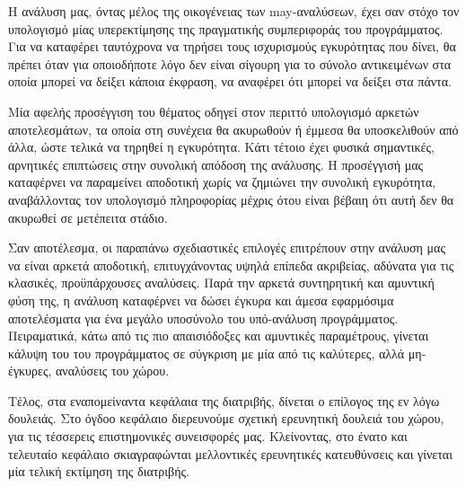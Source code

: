 Η ανάλυση μας, όντας μέλος της οικογένειας των {\en may}-αναλύσεων, έχει σαν στόχο τον υπολογισμό μίας υπερεκτίμησης της πραγματικής συμπεριφοράς του προγράμματος. Για να καταφέρει ταυτόχρονα να τηρήσει τους ισχυρισμούς εγκυρότητας που δίνει, θα πρέπει όταν για οποιοδήποτε λόγο δεν είναι σίγουρη για το σύνολο αντικειμένων στα οποία μπορεί να δείξει κάποια έκφραση, να αναφέρει ότι μπορεί να δείξει στα πάντα.

Μία αφελής προσέγγιση του θέματος οδηγεί στον περιττό υπολογισμό αρκετών αποτελεσμάτων, τα οποία στη συνέχεια θα ακυρωθούν ή έμμεσα θα υποσκελιθούν από άλλα, ώστε τελικά να τηρηθεί η εγκυρότητα. Κάτι τέτοιο έχει φυσικά σημαντικές, αρνητικές επιπτώσεις στην \mbox{συνολική} απόδοση της ανάλυσης. Η προσέγγισή μας καταφέρνει να παραμείνει αποδοτική χωρίς να ζημιώνει την συνολική εγκυρότητα, αναβάλλοντας τον υπολογισμό πληροφορίας μέχρις ότου είναι βέβαιη ότι αυτή δεν θα ακυρωθεί σε μετέπειτα στάδιο.

Σαν αποτέλεσμα, οι παραπάνω σχεδιαστικές επιλογές επιτρέπουν στην ανάλυση μας να είναι αρκετά αποδοτική, επιτυγχάνοντας υψηλά επίπεδα ακριβείας, αδύνατα για τις κλασικές, προϋπάρχουσες αναλύσεις. Παρά την αρκετά συντηρητική και αμυντική φύση της, η ανάλυση καταφέρνει να δώσει έγκυρα και άμεσα εφαρμόσιμα αποτελέσματα για ένα μεγάλο υποσύνολο του υπό-ανάλυση προγράμματος. Πειραματικά, κάτω από τις πιο απαισιόδοξες και αμυντικές παραμέτρους, γίνεται κάλυψη του {\en {}} του προγράμματος σε σύγκριση με μία από τις καλύτερες, αλλά μη-έγκυρες, αναλύσεις του χώρου.


\vspace{5 mm}
Τέλος, στα εναπομείναντα κεφάλαια της διατριβής, δίνεται ο επίλογος της εν λόγω δουλειάς. Στο όγδοο κεφάλαιο διερευνούμε σχετική ερευνητική δουλειά του χώρου, για τις τέσσερεις επιστημονικές συνεισφορές μας. Κλείνοντας, στο ένατο και τελευταίο κεφάλαιο σκιαγραφώνται μελλοντικές ερευνητικές κατευθύνσεις και γίνεται μία τελική εκτίμηση της διατριβής.